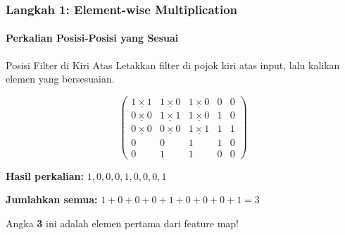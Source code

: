 \documentclass[t,aspectratio=169,xcolor=dvipsnames]{beamer}
\begin{document}
\begin{frame}
    \frametitle{Langkah 1: Element-wise Multiplication}
    \framesubtitle{Perkalian Posisi-Posisi yang Sesuai}
    \footnotesize

    \begin{block}{Posisi Filter di Kiri Atas}
        Letakkan filter di pojok kiri atas input, lalu kalikan elemen yang bersesuaian.
    \end{block}

    $$
    \begin{pmatrix}
    \underline{1 \times 1} & \underline{1 \times 0} & \underline{1 \times 0} & 0 & 0 \\
    \underline{0 \times 0} & \underline{1 \times 1} & \underline{1 \times 0} & 1 & 0 \\
    \underline{0 \times 0} & \underline{0 \times 0} & \underline{1 \times 1} & 1 & 1 \\
    0 & 0 & 1 & 1 & 0 \\
    0 & 1 & 1 & 0 & 0
    \end{pmatrix}
    $$

    \textbf{Hasil perkalian:} $1, 0, 0, 0, 1, 0, 0, 0, 1$

    \textbf{Jumlahkan semua:} $1 + 0 + 0 + 0 + 1 + 0 + 0 + 0 + 1 = 3$

    Angka \textbf{3} ini adalah elemen pertama dari feature map!

\end{frame}
\end{document}
